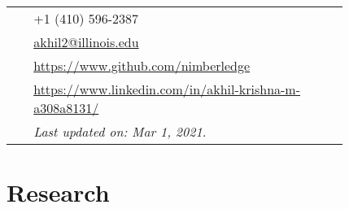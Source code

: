 \documentclass[10pt, oneside, openany]{article} %
\begin{document}
\begin{paracol}{2}
\parbox[top][0.12\textheight][c]{\linewidth}{ %
	\vspace{-0.04\textheight} %
	\colorbox{shade}{ %
		\begin{supertabular}{p{0.05\linewidth}|p{0.775\linewidth}} %
			\raisebox{-1pt}{\faPhone} & +1 (410) 596-2387 \\ %
			\raisebox{0pt}{\small\faEnvelope} & \href{mailto:akhil2@illinois.edu}{akhil2@illinois.edu} \\ %
			\raisebox{-1pt}{\faGithub} & \href{https://www.github.com/nimberledge}{https://www.github.com/nimberledge} \\ %
			\raisebox{-1pt}{\faLinkedinSquare} & \href{https://www.linkedin.com/in/akhil-krishna-m-a308a8131/}{https://www.linkedin.com/in/akhil-krishna-m-a308a8131/} \\ %
			\raisebox{-1pt}{} & \textit{Last updated on: Mar 1, 2021.}\\
		\end{supertabular}
	}
}


\section{Research}





\begin{supertabular}{rl} %
		

\end{supertabular}
\end{paracol}
\end{document}

